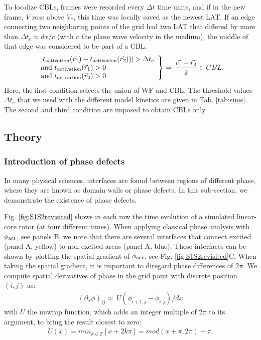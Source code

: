 \documentclass{article}
\newcommand{\phiact}{\ensuremath{\phi_{\rm act}}}
\newcommand{\tact}{\ensuremath{t_{\rm activation}}}
\newcommand{\VS}{V_*}
\begin{document}
To localize CBLs, frames were recorded every $\Delta t$ time units, and if in the new frame, $V$ rose above $\VS$, this time was locally saved as the newest LAT. If an edge connecting two neighboring points of the grid had two LAT that differed by more than $\Delta t_c \approx dx/c$ (with $c$ the plane wave velocity in the medium), the middle of that edge was considered to be part of a CBL: 
\begin{align}
\left. \begin{array}{l} 
| \tact(\vec{r}_1) - \tact(\vec{r}_2)) | > \Delta t_c  \\
\mathrm{and} \ \tact(\vec{r}_1) > 0 \\
\mathrm{and} \ \tact(\vec{r}_2) > 0 
\end{array} \right\}
\Rightarrow \frac{\vec{r_1} + \vec{r_2}}{2} \in CBL. \label{CBLdetection}
\end{align}
Here, the first condition selects the union of WF and CBL. The threshold values $\Delta t_c$ that we used with the different model kinetics are given in Tab. \ref{tab:sims}. The second and third condition are imposed to obtain CBLs only. 


\subsection{Theory}\label{sec:theory}

\subsubsection{Introduction of phase defects}

In many physical sciences, interfaces are found between regions of different phase, where they are known as domain walls or phase defects. In this sub-section, we demonstrate the existence of phase defects. 

Fig. \ref{fig:S1S2revisited} shows in each row the time evolution of a simulated linear-core rotor (at four different times). When applying classical phase analysis with $\phiact$, see panels B, we note that there are several interfaces that connect excited (panel A, yellow) to non-excited areas (panel A, blue). These interfaces can be shown by plotting the spatial gradient of $\phiact$, see Fig. \ref{fig:S1S2revisited}C. When taking the spatial gradient, it is important to diregard phase differences of $2\pi$. We compute spatial derivatives of phase in the grid point with discrete position $(i,j)$ as: 
\begin{align} 
(\partial_x \phi)_{ij} \approx \ U(\phi_{i+1,j} - \phi_{i,j})/dx
\end{align}
with $U$ the unwrap function, which adds an integer multiple of $2\pi$ to its argument, to bring the result closest to zero:
 \begin{align}
     U(x) = min_{k \in \mathbb{Z}} [ x + 2k \pi ] =  mod( x + \pi, 2\pi) - \pi.
 \end{align}
\end{document}
